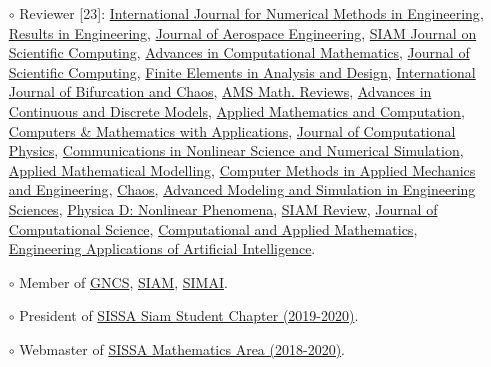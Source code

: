 \documentclass[
  usegeometry%
]{scrartcl}
\begin{document}
\begin{cv}{}
{\begin{itemize}
    \item[$\circ$] Reviewer [23]: \href{https://onlinelibrary.wiley.com/journal/10970207}{ International Journal for Numerical Methods in Engineering}, \href{https://www.sciencedirect.com/journal/results-in-engineering}{Results in Engineering}, \href{https://ascelibrary.org/journal/jaeeez}{Journal of Aerospace Engineering}, \href{https://sisc.siam.org}{SIAM Journal on Scientific Computing}, \href{https://www.springer.com/journal/10444}{Advances in Computational Mathematics}, \href{https://www.springer.com/journal/10915}{Journal of Scientific Computing}, \href{https://www.sciencedirect.com/journal/finite-elements-in-analysis-and-design}{Finite Elements in Analysis and Design}, \href{https://www.worldscientific.com/worldscinet/ijbc}{International Journal of Bifurcation and Chaos}, \href{http://www.ams.org/publications/math-reviews/math-reviews}{AMS Math. Reviews}, \href{https://advancesindifferenceequations.springeropen.com}{Advances in Continuous and Discrete Models}, \href{https://www.sciencedirect.com/journal/applied-mathematics-and-computation}{Applied Mathematics and Computation}, \href{https://www.sciencedirect.com/journal/computers-and-mathematics-with-applications}{Computers \& Mathematics with Applications}, \href{https://www.sciencedirect.com/journal/journal-of-computational-physics}{Journal of Computational Physics}, \href{https://www.sciencedirect.com/journal/communications-in-nonlinear-science-and-numerical-simulation}{Communications in Nonlinear Science and Numerical Simulation}, \href{https://www.sciencedirect.com/journal/applied-mathematical-modelling}{Applied Mathematical Modelling}, \href{https://www.sciencedirect.com/journal/computer-methods-in-applied-mechanics-and-engineering}{Computer Methods in Applied Mechanics and Engineering}, \href{https://pubs.aip.org/aip/cha}{Chaos}, \href{https://amses-journal.springeropen.com}{Advanced Modeling and Simulation in Engineering Sciences}, \href{https://www.sciencedirect.com/journal/physica-d-nonlinear-phenomena}{Physica D: Nonlinear Phenomena}, \href{https://epubs.siam.org/journal/sirev}{SIAM Review}, \href{https://www.sciencedirect.com/journal/journal-of-computational-science}{Journal of Computational Science}, \href{https://link.springer.com/journal/40314}{Computational and Applied Mathematics}, \href{https://www.sciencedirect.com/journal/engineering-applications-of-artificial-intelligence}{Engineering Applications of Artificial Intelligence}.
    \item[$\circ$] Member of \href{https://www.altamatematica.it/gncs/}{GNCS}, \href{https://www.siam.org}{SIAM}, \href{https://www.simai.eu}{SIMAI}.
    \item[$\circ$] President of \href{http://www.math.sissa.it/content/sissa-siam-student-chapter}{SISSA Siam Student Chapter (2019-2020)}.
    \item[$\circ$] Webmaster of \href{https://www.math.sissa.it/content/mathematical-analysis-modelling-and-applications-0}{SISSA Mathematics Area (2018-2020)}.
\end{itemize}}


\end{cv}
\end{document}
